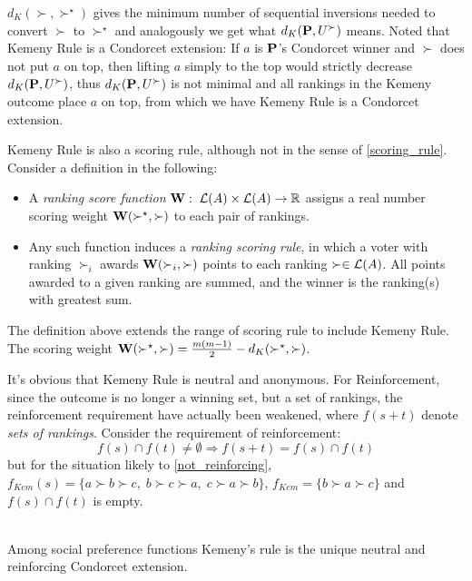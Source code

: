 $d_K(\succ,\succ^\star)$ gives the minimum number of sequential inversions needed to convert $\succ$ to $\succ^\star$ and analogously we get what $d_K (\mathbf{P},U^\succ)$ means. Noted that Kemeny Rule is a Condorcet extension: If $a$ is $\mathbf{P}$'s Condorcet winner and $\succ$ does not put $a$ on top, then lifting $a$ simply to the top would strictly decrease $d_K(\mathbf{P},U^\succ)$, thus $d_K(\mathbf{P},U^\succ)$ is not minimal and all rankings in the Kemeny outcome place $a$ on top, from which we have Kemeny Rule is a Condorcet extension.

Kemeny Rule is also a scoring rule, although not in the sense of \cref{scoring_rule}. Consider a definition in the following:

\begin{definition}
    \begin{itemize}
        \item A \emph{ranking score function} $\mathbf{W}:\; \mathcal{L}(A) \times \mathcal{L}(A) \to \mathbb{R}$ assigns a real number scoring weight $\mathbf{W}(\succ^\star, \succ)$ to each pair of rankings.
        \item Any such function induces a \emph{ranking scoring rule}, in which a voter with ranking $\succ_i$ awards $\mathbf{W}(\succ_i, \succ)$ points to each ranking $\succ \in \mathcal{L}(A)$. All points awarded to a given ranking are summed, and the winner is the ranking(s) with greatest sum.
    \end{itemize}
\end{definition}

The definition above extends the range of scoring rule to include Kemeny Rule. The scoring weight $\mathbf{W}(\succ^\star, \succ) = \frac{m(m-1)}{2} - d_K(\succ^\star,\succ)$.

It's obvious that Kemeny Rule is neutral and anonymous. For Reinforcement, since the outcome is no longer a winning set, but a set of rankings, the reinforcement requirement have actually been weakened, where $f(s+t)$ denote \emph{sets of rankings}. Consider the requirement of reinforcement:
$$
f(s) \cap f(t) \neq \emptyset \Rightarrow f(s+t) = f(s) \cap f(t)
$$
but for the situation likely to \cref{not_reinforcing}, $f_{\textit{Kem}}(s) = \{a \succ b \succ c,\; b \succ c \succ a,\; c \succ a \succ b\}$, $f_{\textit{Kem}} = \{b \succ a \succ c\}$ and $f(s) \cap f(t)$ is empty.\\
~\\
\begin{theorem}
    Among social preference functions Kemeny's rule is the unique neutral and reinforcing Condorcet extension.
\end{theorem}

